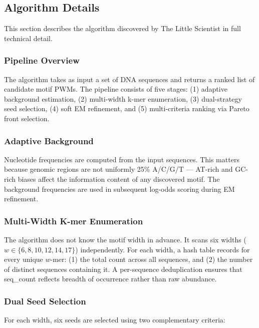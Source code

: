 \documentclass[11pt,a4paper]{article}
\begin{document}
\subsection{Algorithm Details}
\label{sec:algorithm}

This section describes the algorithm discovered by The Little Scientist in full technical detail.

\subsubsection{Pipeline Overview}

The algorithm takes as input a set of DNA sequences and returns a ranked list of candidate motif PWMs. The pipeline consists of five stages: (1) adaptive background estimation, (2) multi-width k-mer enumeration, (3) dual-strategy seed selection, (4) soft EM refinement, and (5) multi-criteria ranking via Pareto front selection.

\subsubsection{Adaptive Background}

Nucleotide frequencies are computed from the input sequences. This matters because genomic regions are not uniformly 25\% A/C/G/T --- AT-rich and GC-rich biases affect the information content of any discovered motif. The background frequencies are used in subsequent log-odds scoring during EM refinement.

\subsubsection{Multi-Width K-mer Enumeration}

The algorithm does not know the motif width in advance. It scans six widths ($w \in \{6, 8, 10, 12, 14, 17\}$) independently. For each width, a hash table records for every unique $w$-mer: (1) the total count across all sequences, and (2) the number of distinct sequences containing it. A per-sequence deduplication ensures that seq\_count reflects breadth of occurrence rather than raw abundance.

\subsubsection{Dual Seed Selection}

For each width, six seeds are selected using two complementary criteria:
\end{document}
